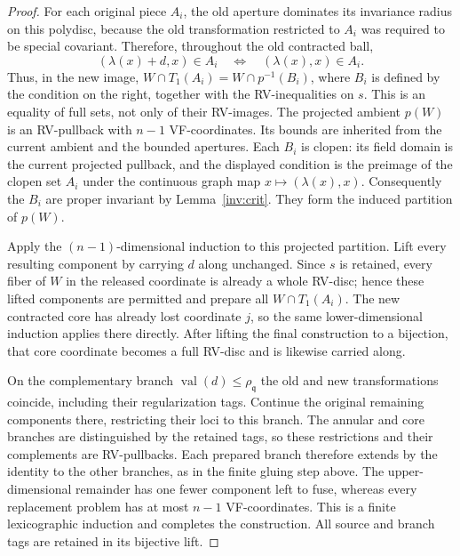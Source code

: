\documentclass[12pt]{amsart}
\theoremstyle{plain}
\theoremstyle{definition}
\theoremstyle{remark}
\numberwithin{equation}{section}
\theoremstyle{plain}
\newcommand{\gq}{\mathfrak{q}}
\newcommand{\0}{\emptyset}
\DeclareMathOperator{\vv}{val}
\begin{document}
\begin{proof}
For each original piece $A_i$, the old aperture dominates its invariance radius on this polydisc, because the old transformation restricted to $A_i$ was required to be special covariant. Therefore, throughout the old contracted ball,
\[
(\lambda(x)+d,x)\in A_i
\quad\Longleftrightarrow\quad
(\lambda(x),x)\in A_i.
\]
Thus, in the new image, $W\cap T_1(A_i)=W\cap p^{-1}(B_i)$, where $B_i$ is defined by the condition on the right, together with the RV-inequalities on $s$. This is an equality of full sets, not only of their RV-images. The projected ambient $p(W)$ is an RV-pullback with $n-1$ VF-coordinates. Its bounds are inherited from the current ambient and the bounded apertures. Each $B_i$ is clopen: its field domain is the current projected pullback, and the displayed condition is the preimage of the clopen set $A_i$ under the continuous graph map $x\mapsto(\lambda(x),x)$. Consequently the $B_i$ are proper invariant by Lemma~\ref{inv:crit}. They form the induced partition of $p(W)$.

Apply the $(n-1)$-dimensional induction to this projected partition. Lift every resulting component by carrying $d$ along unchanged. Since $s$ is retained, every fiber of $W$ in the released coordinate is already a whole RV-disc; hence these lifted components are permitted and prepare all $W\cap T_1(A_i)$. The new contracted core has already lost coordinate $j$, so the same lower-dimensional induction applies there directly. After lifting the final construction to a bijection, that core coordinate becomes a full RV-disc and is likewise carried along.

On the complementary branch $\vv(d)\leq\rho_\gq$ the old and new transformations coincide, including their regularization tags. Continue the original remaining components there, restricting their loci to this branch. The annular and core branches are distinguished by the retained tags, so these restrictions and their complements are RV-pullbacks. Each prepared branch therefore extends by the identity to the other branches, as in the finite gluing step above. The upper-dimensional remainder has one fewer component left to fuse, whereas every replacement problem has at most $n-1$ VF-coordinates. This is a finite lexicographic induction and completes the construction. All source and branch tags are retained in its bijective lift.
\end{proof}
\end{document}
